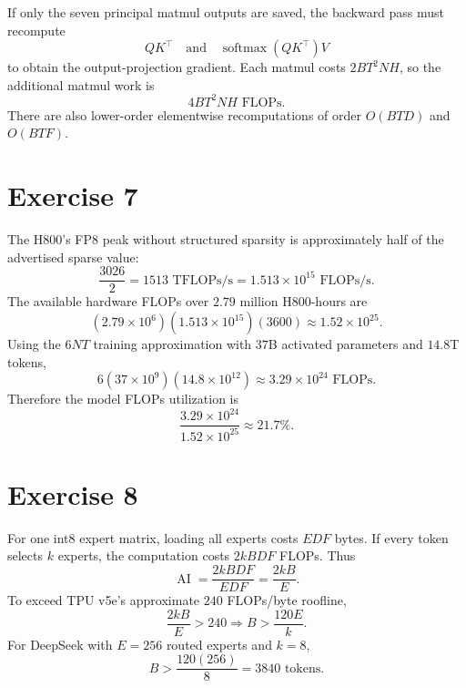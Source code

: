 \documentclass[11pt]{article}
\newcommand{\AI}{\operatorname{AI}}
\begin{document}
If only the seven principal matmul outputs are saved, the backward pass must
recompute
\[
QK^\top
\quad\text{and}\quad
\operatorname{softmax}(QK^\top)V
\]
to obtain the output-projection gradient. Each matmul costs $2BT^2NH$, so the
additional matmul work is
\[
\boxed{4BT^2NH\text{ FLOPs}}.
\]
There are also lower-order elementwise recomputations of order $O(BTD)$ and
$O(BTF)$.

\section*{Exercise 7}

The H800's FP8 peak without structured sparsity is approximately half of the
advertised sparse value:
\[
\frac{3026}{2}=1513\text{ TFLOPs/s}=1.513\times10^{15}\text{ FLOPs/s}.
\]
The available hardware FLOPs over $2.79$ million H800-hours are
\[
(2.79\times10^6)(1.513\times10^{15})(3600)
\approx1.52\times10^{25}.
\]
Using the $6NT$ training approximation with $37$B activated parameters and
$14.8$T tokens,
\[
6(37\times10^9)(14.8\times10^{12})
\approx3.29\times10^{24}\text{ FLOPs}.
\]
Therefore the model FLOPs utilization is
\[
\boxed{\frac{3.29\times10^{24}}{1.52\times10^{25}}\approx21.7\%}.
\]

\section*{Exercise 8}

For one int8 expert matrix, loading all experts costs $EDF$ bytes. If every
token selects $k$ experts, the computation costs $2kBDF$ FLOPs. Thus
\[
\AI=\frac{2kBDF}{EDF}=\frac{2kB}{E}.
\]
To exceed TPU v5e's approximate $240$ FLOPs/byte roofline,
\[
\frac{2kB}{E}>240
\Longrightarrow
\boxed{B>\frac{120E}{k}}.
\]
For DeepSeek with $E=256$ routed experts and $k=8$,
\[
\boxed{B>\frac{120(256)}{8}=3840\text{ tokens}}.
\]
\end{document}
